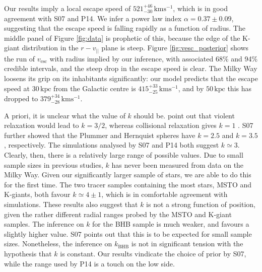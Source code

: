 \documentclass[useAMS,twocolumn,usenatbib]{mn2e}
\def\kpc{{\,\mathrm{kpc}}}
\def\kms{{\,\mathrm{kms^{-1}}}}
\def\vlos{{v_{||}}}
\def\vesc{{v_\mathrm{esc}}}
\begin{document}
Our results imply a local escape speed of $521^{+46}_{-30}\kms$, which is in good agreement with S07 and P14.  
We infer a power law index $\alpha = 0.37\pm0.09$, suggesting that the escape speed is falling rapidly as a function of radius.
The middle panel of Figure \ref{fig:data} is prophetic of this, because the edge of the K-giant distribution in the $r-\vlos$ plane is steep.
Figure \ref{fig:vesc_posterior} shows the run of $\vesc$ with radius implied by our inference, with associated 68\% and 94\% credible intervals, and the steep drop in the escape speed is clear.
The Milky Way loosens its grip on its inhabitants significantly: our model predicts that the escape speed at $30\kpc$ from the Galactic centre is $415^{+33}_{-25}\kms$, and by $50\kpc$ this has dropped to $379^{+34}_{-28}\kms$.

A priori, it is unclear what the value of $k$ should be. 
\citet{Le90} point out that violent relaxation would lead to $k=3/2$, whereas collisional relaxation gives $k=1$ \citep{Sp72}. 
S07 further showed that the Plummer and Hernquist spheres \citep{BT08} have $k=2.5$ and $k=3.5$, respectively. 
The simulations analysed by S07 and P14 both suggest $k\simeq3$. 
Clearly, then, there is a relatively large range of possible values.  
Due to small sample sizes in previous studies, $k$ has never been measured from data on the Milky Way. 
Given our significantly larger sample of stars, we are able to do this for the first time. 
The two tracer samples containing the most stars, MSTO and K-giants, both favour $k\simeq4\pm1$, which is in comfortable agreement with simulations.
These results also suggest that $k$ is not a strong function of position, given the rather different radial ranges probed by the MSTO and K-giant samples.
The inference on $k$ for the BHB sample is much weaker, and favours a slightly higher value. 
S07 points out that this is to be expected for small sample sizes. 
Nonetheless, the inference on $k_\mathrm{BHB}$ is not in significant tension with the hypothesis that $k$ is constant. 
Our results vindicate the choice of prior by S07, while the range used by P14 is a touch on the low side.
\end{document}
